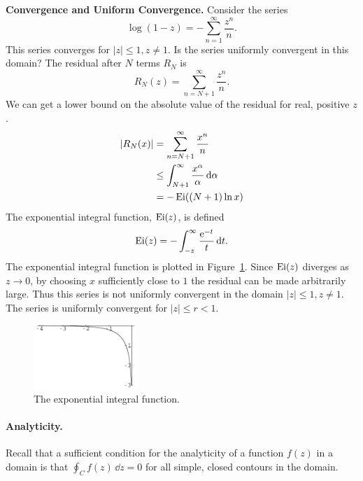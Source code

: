 \begin{Example} 
  \label{conv_unif_conv}
  \textbf{Convergence and Uniform Convergence.}
  Consider the series
  \[ 
  \log(1 - z) = -\sum_{n=1}^\infty \frac{z^n}{n}.
  \]
  This series converges for $|z| \leq 1, z \neq 1$.  
  Is the series uniformly convergent in this domain?  The residual after $N$ 
  terms $R_N$ is
  \[ 
  R_N(z) = \sum_{n=N+1}^\infty \frac{z^n}{n}.
  \]
  We can get a lower bound on the absolute value of the residual for real,
  positive $z$.
  \begin{align*}
    |R_N(x)| &= \sum_{n=N+1}^\infty \frac{x^n}{n} 
    \\
    &\leq \int_{N+1}^\infty \frac{x^\alpha}{\alpha}\,\mathrm{d} \alpha 
    \\
    &= -\mathop{\mathrm{Ei}}\nolimits((N+1) \ln x) 
  \end{align*}
  The exponential integral function, $\mathop{\mathrm{Ei}}\nolimits(z)$, is defined
  \[ 
  \mathop{\mathrm{Ei}}\nolimits(z) = - \int_{-z}^\infty \frac{\mathop{\mathrm{e}}\nolimits^{-t}}{t}\,\mathrm{d} t. 
  \]
  The exponential integral function is plotted in Figure~\ref{exp_int}.
  Since $\mathop{\mathrm{Ei}}\nolimits(z)$ diverges as $z \to 0$, 
  by choosing $x$ sufficiently close to $1$ the residual can
  be made arbitrarily large.  Thus this series is not uniformly convergent
  in the domain $|z| \leq 1, z \neq 1$.
  The series is uniformly convergent for $|z| \leq r < 1$.

  \begin{center}
    \begin{figure}[htb!]
      \begin{center}
        \includegraphics[width=0.35\textwidth]{fcv/series/exp_int}
      \end{center}
      \caption{The exponential integral function.}
      \label{exp_int}
    \end{figure}
  \end{center}

\end{Example}








\paragraph{Analyticity.}
Recall that a sufficient condition for the analyticity of a function $f(z)$
in a domain is that $\oint_C f(z)\,\dd z = 0$ for all simple, closed
contours in the domain.

